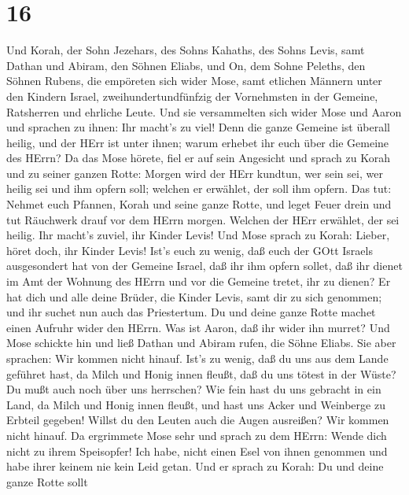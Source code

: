 \hypertarget{section-15}{%
\section{16}\label{section-15}}

 Und Korah, der Sohn Jezehars, des Sohns Kahaths, des Sohns
Levis, samt Dathan und Abiram, den Söhnen Eliabs, und On, dem Sohne
Peleths, den Söhnen Rubens,  die empöreten sich wider Mose,
samt etlichen Männern unter den Kindern Israel, zweihundertundfünfzig
der Vornehmsten in der Gemeine, Ratsherren und ehrliche Leute.
 Und sie versammelten sich wider Mose und Aaron und sprachen
zu ihnen: Ihr macht's zu viel! Denn die ganze Gemeine ist überall
heilig, und der HErr ist unter ihnen; warum erhebet ihr euch über die
Gemeine des HErrn?  Da das Mose hörete, fiel er auf sein
Angesicht  und sprach zu Korah und zu seiner ganzen Rotte:
Morgen wird der HErr kundtun, wer sein sei, wer heilig sei und ihm
opfern soll; welchen er erwählet, der soll ihm opfern.  Das
tut: Nehmet euch Pfannen, Korah und seine ganze Rotte,  und
leget Feuer drein und tut Räuchwerk drauf vor dem HErrn morgen. Welchen
der HErr erwählet, der sei heilig. Ihr macht's zuviel, ihr Kinder Levis!
 Und Mose sprach zu Korah: Lieber, höret doch, ihr Kinder
Levis!  Ist's euch zu wenig, daß euch der GOtt Israels
ausgesondert hat von der Gemeine Israel, daß ihr ihm opfern sollet, daß
ihr dienet im Amt der Wohnung des HErrn und vor die Gemeine tretet, ihr
zu dienen?  Er hat dich und alle deine Brüder, die Kinder
Levis, samt dir zu sich genommen; und ihr suchet nun auch das
Priestertum.  Du und deine ganze Rotte machet einen Aufruhr
wider den HErrn. Was ist Aaron, daß ihr wider ihn murret? 
Und Mose schickte hin und ließ Dathan und Abiram rufen, die Söhne
Eliabs. Sie aber sprachen: Wir kommen nicht hinauf.  Ist's
zu wenig, daß du uns aus dem Lande geführet hast, da Milch und Honig
innen fleußt, daß du uns tötest in der Wüste? Du mußt auch noch über uns
herrschen?  Wie fein hast du uns gebracht in ein Land, da
Milch und Honig innen fleußt, und hast uns Acker und Weinberge zu
Erbteil gegeben! Willst du den Leuten auch die Augen ausreißen? Wir
kommen nicht hinauf.  Da ergrimmete Mose sehr und sprach zu
dem HErrn: Wende dich nicht zu ihrem Speisopfer! Ich habe, nicht einen
Esel von ihnen genommen und habe ihrer keinem nie kein Leid getan.
 Und er sprach zu Korah: Du und deine ganze Rotte sollt
